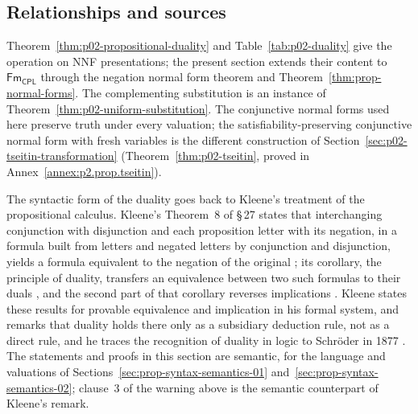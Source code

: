 \subsection{Relationships and sources}
\label{sec:p02-w02-p02-010-relationships}

Theorem~\ref{thm:p02-propositional-duality} and
Table~\ref{tab:p02-duality} give the operation on NNF presentations; the
present section extends their content to \(\mathsf{Fm}_{\mathsf{CPL}}\) through
the negation normal form theorem and Theorem~\ref{thm:prop-normal-forms}.  The
complementing substitution is an instance of
Theorem~\ref{thm:p02-uniform-substitution}.  The conjunctive normal forms used
here preserve truth under every valuation; the satisfiability-preserving
conjunctive normal form with fresh variables is the different construction of
Section~\ref{sec:p02-tseitin-transformation}
(Theorem~\ref{thm:p02-tseitin}, proved in Annex~\ref{annex:p2.prop.tseitin}).

The syntactic form of the duality goes back to Kleene's treatment of the
propositional calculus.  Kleene's Theorem~8 of \S\,27 states that
interchanging conjunction with disjunction and each proposition letter with its
negation, in a formula built from letters and negated letters by conjunction
and disjunction, yields a formula equivalent to the negation of the original
\cite[\S\,27, Theorem~8, p.~121]{Kleene1952}; its corollary, the principle of
duality, transfers an equivalence between two such formulas to their duals
\cite[\S\,27, p.~122]{Kleene1952}, and the second part of that corollary
reverses implications \cite[\S\,27, p.~124]{Kleene1952}.  Kleene states these
results for provable equivalence and implication in his formal system, and
remarks that duality holds there only as a subsidiary deduction rule, not as a
direct rule, and he traces the recognition of duality in logic to Schr\"oder
in 1877 \cite[\S\,27, p.~123]{Kleene1952}.  The statements and proofs in this section
are semantic, for the language and valuations of
Sections~\ref{sec:prop-syntax-semantics-01}
and~\ref{sec:prop-syntax-semantics-02}; clause~3 of the warning above is the
semantic counterpart of Kleene's remark.
